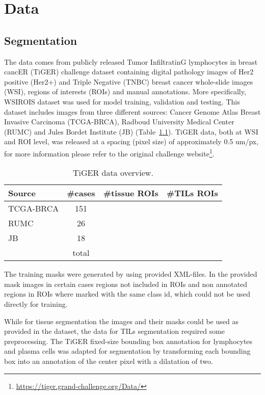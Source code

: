 \chapter{Data}
\section{Segmentation}
The data comes from publicly released Tumor InfiltratinG lymphocytes in
breast cancER (TiGER) challenge dataset containing
digital pathology images of Her2 positive (Her2+) and Triple Negative (TNBC) breast
cancer whole-slide images (WSI), regions of interests (ROIs) and manual annotations. More specifically, WSIROIS dataset
was used for model training, validation and testing. This dataset includes images from three different sources:
Cancer Genome Atlas Breast Invasive Carcinoma (TCGA-BRCA),
Radboud University Medical Center (RUMC) and Jules Bordet Institute (JB) (Table~\ref*{tab:segm_data}).
TiGER data, both at WSI and ROI level, was released at a spacing (pixel size) of approximately 0.5 um/px,
for more information please refer to the original challenge
website\footnote{\url{https://tiger.grand-challenge.org/Data/}}.
\begin{table}[h!]
\centering
\begin{tabular}{ l c c c } 
\hline
Source & \#cases & \#tissue ROIs & \#TILs ROIs \\ 
\hline
TCGA-BRCA & 151 & &  \\ 
RUMC & 26 & &  \\ 
JB & 18 & & \\
\hline
 & total &  & \\
\end{tabular}
\caption{\label{tab:segm_data}TiGER data overview.}
\end{table}
The training masks were generated by using provided XML-files. In the provided mask
images in certain cases regions not included in ROIs and non annotated regions in ROIs where
marked with the same class id, which could not be used directly for training. 

While for tissue segmentation the images and their masks could be used as provided in the 
dataset, the data for TILs segmentation required some preprocessing. The TiGER fixed-size bounding box
annotation for lymphocytes and plasma cells was adapted for segmentation by transforming each
bounding box into an annotation of the center pixel with a dilatation of two. 

